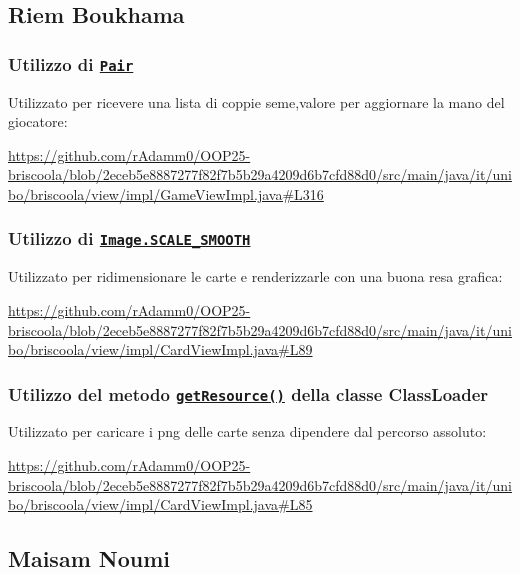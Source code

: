 \documentclass[a4paper,12pt]{report}
\begin{document}
\subsection{Riem Boukhama}
\subsubsection{\textbf{Utilizzo di \href{https://commons.apache.org/proper/commons-lang/apidocs/org/apache/commons/lang3/tuple/Pair.html}{\texttt{Pair}}}}
Utilizzato per ricevere una lista di coppie seme,valore per aggiornare la mano del giocatore:
\begin{sloppypar}
    \raggedright
    \url{https://github.com/rAdamm0/OOP25-briscoola/blob/2eceb5e8887277f82f7b5b29a4209d6b7cfd88d0/src/main/java/it/unibo/briscoola/view/impl/GameViewImpl.java#L316}
\end{sloppypar}

\subsubsection{\textbf{Utilizzo di \href{https://docs.oracle.com/javase/8/docs/api/java/awt/Image.html\#SCALE_SMOOTH}{\texttt{Image.SCALE\_SMOOTH}}}}
Utilizzato per ridimensionare le carte e renderizzarle con una buona resa grafica:
\begin{sloppypar}
    \raggedright
    \url{https://github.com/rAdamm0/OOP25-briscoola/blob/2eceb5e8887277f82f7b5b29a4209d6b7cfd88d0/src/main/java/it/unibo/briscoola/view/impl/CardViewImpl.java#L89}
\end{sloppypar}

\subsubsection{\textbf{Utilizzo del metodo \href{https://docs.oracle.com/javase/8/docs/api/java/lang/ClassLoader.html\#getResource-java.lang.String-}{\texttt{getResource()}} della classe ClassLoader}}
Utilizzato per caricare i png delle carte senza dipendere dal percorso assoluto:
\begin{sloppypar}
    \raggedright
    \url{https://github.com/rAdamm0/OOP25-briscoola/blob/2eceb5e8887277f82f7b5b29a4209d6b7cfd88d0/src/main/java/it/unibo/briscoola/view/impl/CardViewImpl.java#L85}
\end{sloppypar}

\subsection{Maisam Noumi}
\end{document}
